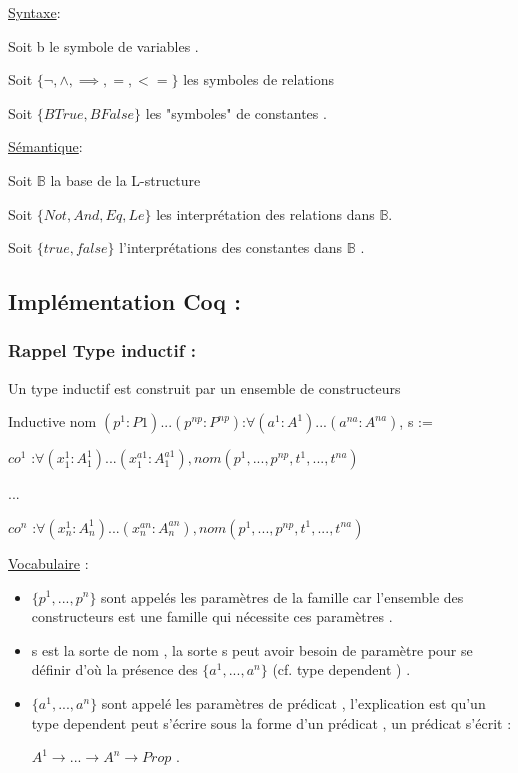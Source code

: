 \documentclass{article}
\begin{document}
\underline{Syntaxe}:

Soit b le symbole de variables  .

Soit $\{\lnot,\land,\implies,=,<=\}$ les symboles de relations

Soit $\{BTrue ,BFalse\}$ les "symboles" de constantes .

\medskip

\underline{Sémantique}:

Soit $\mathbb{B}$ la base de la L-structure 

Soit $\{Not,And,Eq,Le\}$  les interprétation des relations dans  $\mathbb{B}$.

Soit $\{true,false\}$ l'interprétations des constantes dans $\mathbb{B}$ .


\subsection{Implémentation Coq :}

\subsubsection{Rappel Type inductif :}
Un type inductif est construit par un ensemble de constructeurs 

\medskip 

Inductive nom $( p^1:P1)...(p^{np}:P^{np})$:$\forall (a^1:A^1)... (a^{na}:A^{na})$, s :=

$co^1$ :$\forall (x_1^1:A_1^1)...(x_1^{a1}:A_1^{a1}),nom(p^1,...,p^{np},t^1,...,t^{na}) $

...

$co^{n}$ :$\forall (x_{n}^1:A_{n}^{1})...(x_{n}^{an}:A_{n}^{an}),nom(p^1,...,p^{np},t^1,...,t^{na}) $

\bigskip

\underline{Vocabulaire} :
\begin{itemize}
 \item $\{ p^1,...,p^n\}$  sont appelés les paramètres de la famille car l'ensemble des constructeurs est une famille qui nécessite ces paramètres .



 \item s est la sorte de nom , la sorte s peut avoir besoin de paramètre pour se définir d'où la présence des  $\{ a^1,...,a^n\}$ (cf. type dependent ) .


 \item $\{ a^1,...,a^n\}$ sont appelé les paramètres de prédicat , l'explication est qu'un type dependent peut s'écrire sous la forme d'un prédicat , un prédicat s'écrit :

$A^1 \rightarrow ... \rightarrow  A^n \rightarrow  Prop $ .
\end{itemize}
\end{document}
